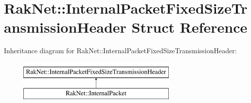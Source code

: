 \hypertarget{struct_rak_net_1_1_internal_packet_fixed_size_transmission_header}{\section{Rak\-Net\-:\-:Internal\-Packet\-Fixed\-Size\-Transmission\-Header Struct Reference}
\label{struct_rak_net_1_1_internal_packet_fixed_size_transmission_header}
}
Inheritance diagram for Rak\-Net\-:\-:Internal\-Packet\-Fixed\-Size\-Transmission\-Header\-:\begin{figure}[H]
\begin{center}
\leavevmode
\includegraphics[height=2.000000cm]{struct_rak_net_1_1_internal_packet_fixed_size_transmission_header}
\end{center}
\end{figure}
